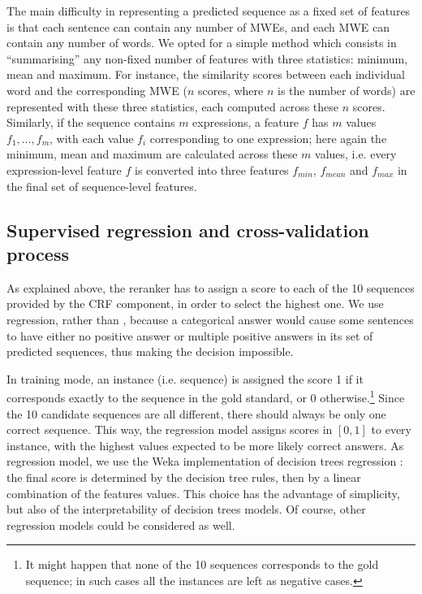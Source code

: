 \documentclass[output=paper
,modfonts
,nonflat]{langsci/langscibook}
\begin{document}
The main difficulty in representing a predicted sequence as a fixed
set of features is that each sentence can contain any number of MWEs,
and each MWE can contain any number of words. We opted for a simple
method which consists in ``summarising'' any non-fixed number of
features with three statistics: minimum, mean and maximum. For
instance, the similarity scores between each individual word and the
corresponding MWE ($n$ scores, where $n$ is the number of words) are represented
with these three statistics, each computed across these $n$
scores. Similarly, if the sequence contains $m$ expressions, a feature
$f$ has $m$ values $f_1,\dots,f_m$, with each value $f_i$ corresponding to one
expression; here again the minimum, mean and maximum are calculated
across these $m$ values, i.e. every expression-level feature $f$ is
converted into three features $f_{min}$, $f_{mean}$ and $f_{max}$ in
the final set of sequence-level features. 




\subsection{Supervised regression and cross-validation process}

As explained above, the reranker has to assign a score to each of the
10 sequences provided by the CRF component, in order to select the highest
one. We use regression, rather than , because a
categorical answer would cause some sentences to have either no
positive answer or multiple positive answers in its set of predicted
sequences, thus making the decision impossible.

In training mode, an instance (i.e. sequence) is assigned the score 1 if
it corresponds exactly to the sequence in the gold standard, or 0
otherwise.\footnote{It might happen that none of the 10 sequences
  corresponds to the gold sequence; in such cases all the instances
  are left as negative cases.} Since the 10 candidate sequences are
all different, there should always be only one correct sequence. This
way, the regression model assigns scores in $[0,1]$ to every instance,
with the highest values expected to be more likely correct answers.  As
regression model, we use the Weka \citep{hall2009weka} implementation of
decision trees regression \citep{M5P}: the final score is determined
by the decision tree rules, then by a linear combination of the
features values. This choice has the advantage of simplicity, but also
of the interpretability of decision trees models. Of course, other
regression models could be considered as well.
\end{document}

